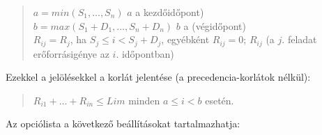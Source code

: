 \begin{quote}
$a = min(S_1,\ldots,S_n)$ {\rm $a$ a kezdőidőpont)} \\
$b = max(S_1+D_1,\ldots,S_n+D_n)$ {\rm $b$ a (végidőpont)}\\
$R_{ij} = R_j$, ha  $S_j \leq i < S_j+D_j$,
        egyébként $R_{ij} = 0$; {\rm $R_{ij}$ (a $j$. feladat erőforrásigénye
        az $i$. időpontban)}
\end{quote}

Ezekkel a jelölésekkel a korlát jelentése (a precedencia-korlátok nélkül):

\begin{quote}
$R_{i1}+\ldots+R_{in} \leq Lim$ minden $a \leq i < b$ esetén.
\end{quote}

Az  opciólista a következő beállításokat tartalmazhatja:

